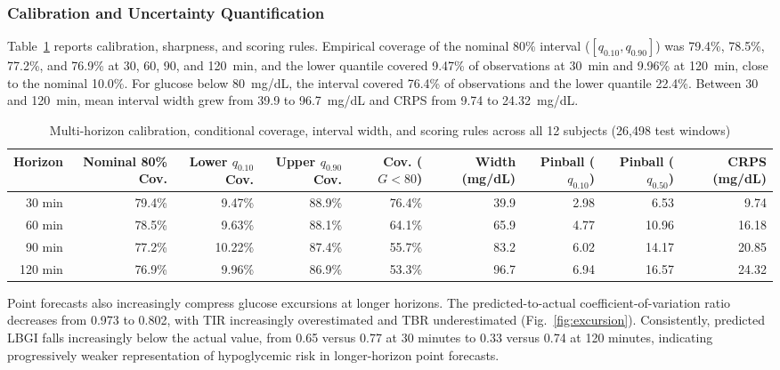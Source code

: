 \documentclass[journal]{IEEEtran}
\begin{document}
\subsubsection{Calibration and Uncertainty Quantification}
Table~\ref{tab:calibration} reports calibration, sharpness, and scoring rules. Empirical coverage of the nominal 80\% interval ($[q_{0.10}, q_{0.90}]$) was 79.4\%, 78.5\%, 77.2\%, and 76.9\% at 30, 60, 90, and 120~min, and the lower quantile covered 9.47\% of observations at 30~min and 9.96\% at 120~min, close to the nominal 10.0\%. For glucose below 80~mg/dL, the interval covered 76.4\% of observations and the lower quantile 22.4\%. Between 30 and 120~min, mean interval width grew from 39.9 to 96.7~mg/dL and CRPS from 9.74 to 24.32~mg/dL.

\begin{table}[t]
\centering
\caption{Multi-horizon calibration, conditional coverage, interval width, and scoring rules across all 12 subjects (26,498 test windows)}
\label{tab:calibration}
\footnotesize
\begin{tabular}{rrrrrrrrr}
\toprule
Horizon & Nominal 80\% Cov. & Lower $q_{0.10}$ Cov. & Upper $q_{0.90}$ Cov. & Cov. ($G<80$) & Width (mg/dL) & Pinball ($q_{0.10}$) & Pinball ($q_{0.50}$) & CRPS (mg/dL) \\
\midrule
30 min  & 79.4\% & 9.47\%  & 88.9\% & 76.4\% & 39.9 & 2.98 & 6.53  & 9.74 \\
60 min  & 78.5\% & 9.63\%  & 88.1\% & 64.1\% & 65.9 & 4.77 & 10.96 & 16.18 \\
90 min  & 77.2\% & 10.22\% & 87.4\% & 55.7\% & 83.2 & 6.02 & 14.17 & 20.85 \\
120 min & 76.9\% & 9.96\%  & 86.9\% & 53.3\% & 96.7 & 6.94 & 16.57 & 24.32 \\
\bottomrule
\end{tabular}
\end{table}



Point forecasts also increasingly compress glucose excursions at longer horizons. The predicted-to-actual coefficient-of-variation ratio decreases from 0.973 to 0.802, with TIR increasingly overestimated and TBR underestimated (Fig.~\ref{fig:excursion}). Consistently, predicted LBGI falls increasingly below the actual value, from 0.65 versus 0.77 at 30 minutes to 0.33 versus 0.74 at 120 minutes, indicating progressively weaker representation of hypoglycemic risk in longer-horizon point forecasts.
\end{document}
